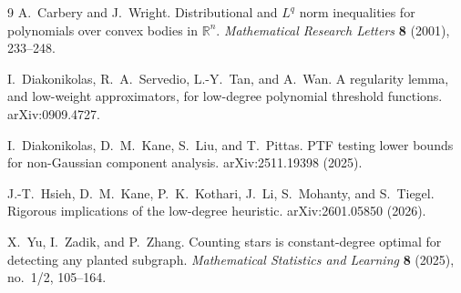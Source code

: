 \documentclass[11pt]{article}
\newcommand{\1}{\mathbf 1}
\theoremstyle{definition}
\theoremstyle{remark}
\numberwithin{equation}{section}
\begin{document}
\begin{thebibliography}{9}
A.~Carbery and J.~Wright.
\newblock Distributional and $L^q$ norm inequalities for polynomials over convex bodies in $\mathbb R^n$.
\newblock \emph{Mathematical Research Letters} \textbf{8} (2001), 233--248.

I.~Diakonikolas, R.~A.~Servedio, L.-Y.~Tan, and A.~Wan.
\newblock A regularity lemma, and low-weight approximators, for low-degree polynomial threshold functions.
\newblock arXiv:0909.4727.

I.~Diakonikolas, D.~M.~Kane, S.~Liu, and T.~Pittas.
\newblock PTF testing lower bounds for non-Gaussian component analysis.
\newblock arXiv:2511.19398 (2025).

J.-T.~Hsieh, D.~M.~Kane, P.~K.~Kothari, J.~Li, S.~Mohanty, and S.~Tiegel.
\newblock Rigorous implications of the low-degree heuristic.
\newblock arXiv:2601.05850 (2026).

X.~Yu, I.~Zadik, and P.~Zhang.
\newblock Counting stars is constant-degree optimal for detecting any planted subgraph.
\newblock \emph{Mathematical Statistics and Learning} \textbf{8} (2025), no.~1/2, 105--164.


\end{thebibliography}
\end{document}
